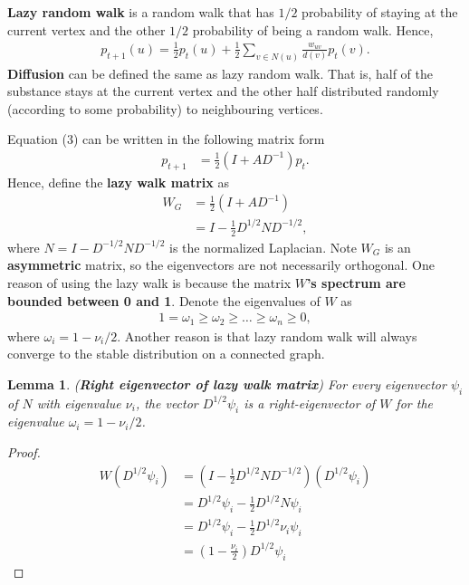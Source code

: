 \documentclass[]{article}
\newtheorem{lemma}{Lemma}[section]
\begin{document}
\textbf{Lazy random walk} is a random walk that has $1/2$ probability of staying at the current vertex and the other $1/2$ probability of being a random walk. Hence, 
\begin{align}
p_{t+1}(u) = \frac{1}{2}p_t(u) + \frac{1}{2}\sum_{v \in N(u)}\frac{w_{uv}}{d(v)}p_t(v).
\end{align}
\textbf{Diffusion} can be defined the same as lazy random walk. That is, half of the substance stays at the current vertex and the other half distributed randomly (according to some probability) to neighbouring vertices. 

Equation (3) can be written in the following matrix form
\begin{align*}
	p_{t+1} &= \frac{1}{2} (I + A D^{-1})p_t. 
\end{align*}
Hence, define the \textbf{lazy walk matrix} as 
\begin{align*}
	W_G &= \frac{1}{2} (I + A D^{-1}) \\
	&= I - \frac{1}{2} D^{1/2} N D^{-1/2},
\end{align*}
where $N = I - D^{-1/2} N D^{-1/2}$ is the normalized Laplacian. Note $W_G$ is an \textbf{asymmetric} matrix, so the eigenvectors are not necessarily orthogonal. One reason of using the lazy walk is because the matrix \textbf{$W$'s spectrum are bounded between 0 and 1}. Denote the eigenvalues of $W$ as 
\begin{align*}
	1 = \omega_1 \ge \omega_2 \ge \dots \ge \omega_n \ge 0,
\end{align*}
where $\omega_i = 1 - \nu_i/2$. Another reason is that lazy random walk will always converge to the stable distribution on a connected graph. 

\begin{lemma} (\textbf{Right eigenvector of lazy walk matrix})
	For every eigenvector $\psi_i$ of $N$ with eigenvalue $\nu_i$, the vector $D^{1/2}\psi_i$ is a right-eigenvector of $W$ for the eigenvalue $\omega_i = 1 - \nu_i/2$.
\end{lemma}
\begin{proof}
	\begin{align*}
		W\left(D^{1/2}\psi_i\right) 
		&= \left(I - \frac{1}{2} D^{1/2} N D^{-1/2}\right)\left(D^{1/2}\psi_i\right) \\
		&= D^{1/2}\psi_i - \frac{1}{2} D^{1/2} N \psi_i \\
		&= D^{1/2}\psi_i - \frac{1}{2} D^{1/2} \nu_i \psi_i \\
		&= (1 - \frac{\nu_i}{2})D^{1/2}\psi_i
	\end{align*}
\end{proof}
\end{document}
